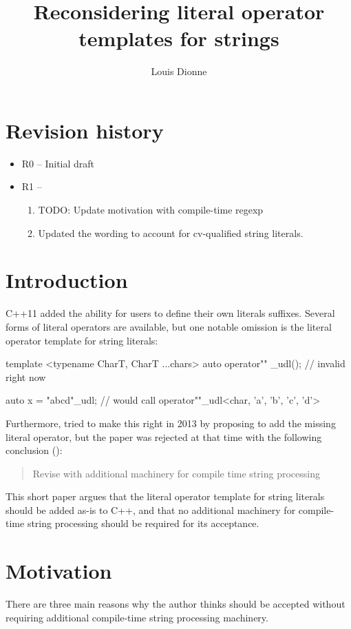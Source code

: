 \documentclass{wg21}
\title{Reconsidering literal operator templates for strings}
\author{Louis Dionne}{ldionne.2@gmail.com}
\begin{document}
\maketitle


\section{Revision history}
\begin{itemize}
  \item R0 -- Initial draft
  \item R1 -- \begin{enumerate}
    \item TODO: Update motivation with compile-time regexp
    \item Updated the wording to account for cv-qualified string literals.
  \end{enumerate}
\end{itemize}


\section{Introduction}
C++11 added the ability for users to define their own literals suffixes.
Several forms of literal operators are available, but one notable omission
is the literal operator template for string literals:

\begin{cpp}
template <typename CharT, CharT ...chars>
auto operator"" _udl(); // invalid right now

auto x = "abcd"_udl; // would call operator""_udl<char, 'a', 'b', 'c', 'd'>
\end{cpp}

Furthermore, \cite{N3599} tried to make this right in 2013 by proposing to add
the missing literal operator, but the paper was rejected at that time with
the following conclusion (\cite{CWG66}):

\begin{quote}
  Revise with additional machinery for compile time string processing
\end{quote}

This short paper argues that the literal operator template for string
literals should be added as-is to C++, and that no additional machinery
for compile-time string processing should be required for its acceptance.


\section{Motivation}
There are three main reasons why the author thinks \cite{N3599} should be
accepted without requiring additional compile-time string processing machinery.
\end{document}
